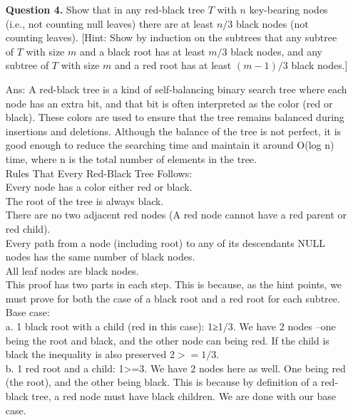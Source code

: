 \documentclass[10pt,letterpaper]{article}
\begin{document}
\begin{itemize}
\item[{\bf Question 4.}] Show that in any red-black tree $T$ with $n$ key-bearing
  nodes (i.e., not counting null leaves) there are at least $n/3$ black
  nodes (not counting leaves). [Hint: Show by induction on the
  subtrees that any subtree of $T$ with size $m$ and a black root has
  at least $m/3$ black nodes, and any subtree of $T$ with size $m$ and
  a red root has at least $(m-1)/3$ black nodes.]
 
\item[Ans: ] A red-black tree is a kind of self-balancing binary search tree where each node has an extra bit, and that bit is often interpreted as the color (red or black). These colors are used to ensure that the tree remains balanced during insertions and deletions. Although the balance of the tree is not perfect, it is good enough to reduce the searching time and maintain it around O(log n) time, where n is the total number of elements in the tree.\\

Rules That Every Red-Black Tree Follows: \\
Every node has a color either red or black.\\
The root of the tree is always black.\\
There are no two adjacent red nodes (A red node cannot have a red parent or red child).\\
Every path from a node (including root) to any of its descendants NULL nodes has the same number of black nodes.\\
All leaf nodes are black nodes.\\

This proof has two parts in each step. This is because, as the hint points, we must prove for both the case of a black root and a red root for each subtree.\\

Base case:\\
a. 1 black root with a child (red in this case): 1≥1/3. We have 2 nodes --one being the root and black, and the other node can being red. If the child is black the inequality is also preserved $2>=1/3$.\\

b. 1 red root and a child: 1>=3. We have 2 nodes here as well. One being red (the
root), and the other being black. This is because by definition of a red- black tree, a red node must have black children. We are done with our base case.\\


\end{itemize}
\end{document}
